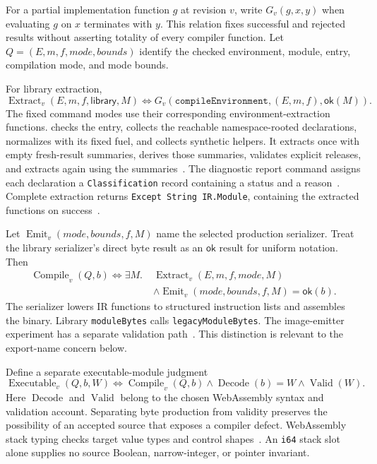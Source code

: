 \documentclass[11pt]{article}
\newcommand{\code}[1]{\texttt{#1}}
\newcommand{\longcode}[1]{\texttt{\seqsplit{#1}}}
\newcommand{\ty}[1]{\mathsf{#1}}
\newcommand{\ok}{\mathsf{ok}}
\begin{document}
For a partial implementation function $g$ at revision $v$, write $G_v(g,x,y)$ when evaluating $g$ on $x$ terminates with $y$.  This relation fixes successful and rejected results without asserting totality of every compiler function.  Let $Q=(E,m,f,\mathit{mode},\mathit{bounds})$ identify the checked environment, module, entry, compilation mode, and mode bounds.

For library extraction,
\[
\operatorname{Extract}_v(E,m,f,\ty{library},M)
\iff G_v(\code{compileEnvironment},(E,m,f),\ok(M)).
\]
The fixed command modes use their corresponding environment-extraction functions.  \longcode{compileEnvironmentWithEntryModeDetailed} checks the entry, collects the reachable namespace-rooted declarations, normalizes with its fixed fuel, and collects synthetic helpers.  It extracts once with empty fresh-result summaries, derives those summaries, validates explicit releases, and extracts again using the summaries~\cite{extract}.  The diagnostic report command assigns each declaration a \code{Classification} record containing a status and a reason~\cite{report}.  Complete extraction returns \code{Except String IR.Module}, containing the extracted functions on success~\cite{extract}.

Let $\operatorname{Emit}_v(\mathit{mode},\mathit{bounds},f,M)$ name the selected production serializer.  Treat the library serializer's direct byte result as an $\ok$ result for uniform notation.  Then
\begin{align*}
\operatorname{Compile}_v(Q,b)\iff\exists M.\;&
\operatorname{Extract}_v(E,m,f,\mathit{mode},M)\\
&\land\operatorname{Emit}_v(\mathit{mode},\mathit{bounds},f,M)=\ok(b).
\end{align*}
The serializer lowers IR functions to structured instruction lists and assembles the binary.  Library \code{moduleBytes} calls \code{legacyModuleBytes}.  The image-emitter experiment has a separate validation path~\cite{binary}.  This distinction is relevant to the export-name concern below.

Define a separate executable-module judgment
\[
\operatorname{Executable}_v(Q,b,W)
\iff\operatorname{Compile}_v(Q,b)\land\operatorname{Decode}(b)=W
       \land\operatorname{Valid}(W).
\]
Here $\operatorname{Decode}$ and $\operatorname{Valid}$ belong to the chosen WebAssembly syntax and validation account.  Separating byte production from validity preserves the possibility of an accepted source that exposes a compiler defect.  WebAssembly stack typing checks target value types and control shapes~\cite{wasm}.  An \code{i64} stack slot alone supplies no source Boolean, narrow-integer, or pointer invariant.
\end{document}
